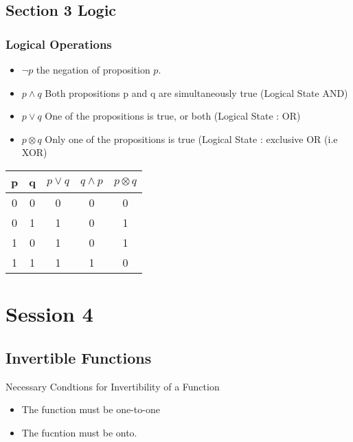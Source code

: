 \documentclass[]{report}
\begin{document}


\section{Section 3 Logic}
\subsection{Logical Operations}
\begin{itemize}
	\item $\neg p$ the negation of proposition $p$.
	\item $p \wedge q$ Both propositions p and q are simultaneously true (Logical State AND)
	\item $p \vee q $ One of the propositions is true, or both (Logical State : OR)
	\item $p \otimes q$ Only one of the propositions is true (Logical State : exclusive OR (i.e XOR)
\end{itemize}
\begin{center}
	\begin{tabular}{|c|c|c|c|c|}
		\hline
		p & q & $p \vee q$ & $q \wedge p$ & $p \otimes q$ \\
		\hline
		0 & 0 & 0 & 0 & 0 \\
		0 & 1 & 1 & 0 & 1\\
		1 & 0 & 1 & 0 & 1 \\
		1 & 1 & 1 & 1 & 0\\
		\hline
	\end{tabular}
\end{center}


\chapter{Session 4}
\section*{Invertible Functions}

Necessary Condtions for Invertibility of a Function
\begin{itemize}
	\item The function must be one-to-one
	\item The fucntion must be onto.
\end{itemize}

\end{document}

